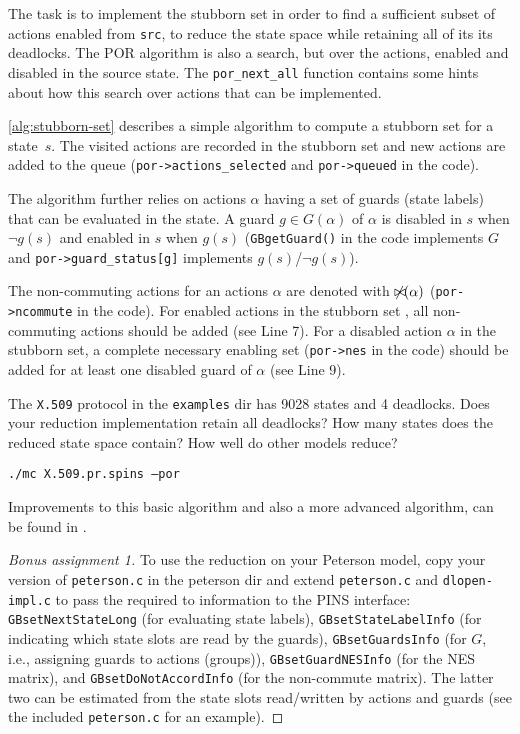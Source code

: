 \documentclass[12pt]{article}
\begin{document}
The task is to implement the stubborn set in order
to find a sufficient subset of actions enabled from
\texttt{src}, to reduce the state space while
retaining all of its its deadlocks.
The POR algorithm is also a search, but over the
actions, enabled and disabled in the source state.
The \texttt{por\_next\_all} function contains some hints about
how this search over actions that can be implemented.

\autoref{alg:stubborn-set} describes a
 simple algorithm to compute a stubborn set \stubbornset for a state~$s$.
The visited actions are recorded in the stubborn set \stubbornset and
new actions are added to the queue \workset (\texttt{por->actions\_selected} and
\texttt{por->queued} in the code).


The algorithm further relies on actions $\alpha$ having a set of guards (state labels)
that can be evaluated in the state. A guard $g\in G(\alpha)$ of $\alpha$ is
disabled in $s$ when $\neg g(s)$ and enabled in $s$ when $g(s)$
(\texttt{GBgetGuard()} in the code implements $G$ and 
\texttt{por->guard\_status[g]} implements $g(s)$/$\neg g(s)$).

The non-commuting actions for an actions $\alpha$ are
denoted with $\not\bowtie\hspace{-1.5mm}(\alpha)$ (\texttt{por->ncommute} in the code).
For enabled actions in the stubborn set \stubbornset, all non-commuting
actions should be added (see Line 7).
For a  disabled action $\alpha$ in the stubborn set,
a complete necessary enabling set (\texttt{por->nes} in the code)
should be added for at least one disabled guard of $\alpha$ (see Line 9).


The \texttt{X.509} protocol in the \texttt{examples} dir has 9028 states and
4 deadlocks. Does your reduction implementation retain all deadlocks?
How many states does the reduced state space contain?
How well do other models reduce?

\texttt{./mc X.509.pr.spins --por}

 
Improvements to this basic algorithm and also a more advanced algorithm, can be
found in \cite{guardpor2}.

\begin{proof}[Bonus assignment 1]
	To use the reduction on your Peterson model, copy your version of
	\texttt{peterson.c} in the peterson dir and extend 
	\texttt{peterson.c} and \texttt{dlopen-impl.c} to pass
	the required to information to the PINS interface:
	\texttt{GBsetNextStateLong} (for evaluating state labels),
	\texttt{GBsetStateLabelInfo} (for indicating which state slots are read by the guards),
	\texttt{GBsetGuardsInfo} (for $G$, i.e., assigning guards to actions (groups)),
	\texttt{GBsetGuardNESInfo} (for the NES matrix), and
	\texttt{GBsetDoNotAccordInfo} (for the non-commute matrix).
	The latter two can be estimated from the state slots read/written 
	by actions and guards (see the included \texttt{peterson.c} for an example).
\end{proof}
\end{document}
